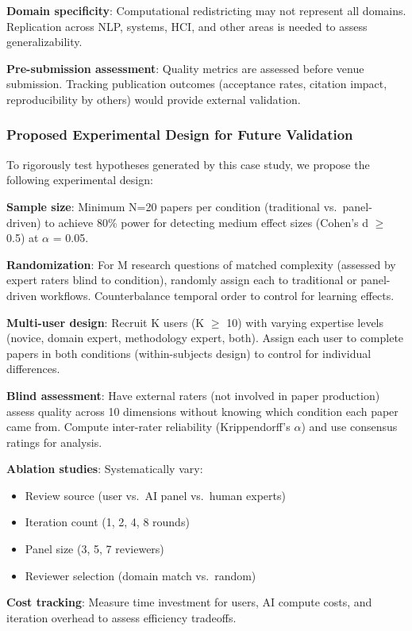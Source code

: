 \textbf{Domain specificity}: Computational redistricting may not represent all domains. Replication across NLP, systems, HCI, and other areas is needed to assess generalizability.

\textbf{Pre-submission assessment}: Quality metrics are assessed before venue submission. Tracking publication outcomes (acceptance rates, citation impact, reproducibility by others) would provide external validation.

\subsubsection{Proposed Experimental Design for Future Validation}

To rigorously test hypotheses generated by this case study, we propose the following experimental design:

\textbf{Sample size}: Minimum N=20 papers per condition (traditional vs.\ panel-driven) to achieve 80\% power for detecting medium effect sizes (Cohen's d $\geq$ 0.5) at $\alpha$ = 0.05.

\textbf{Randomization}: For M research questions of matched complexity (assessed by expert raters blind to condition), randomly assign each to traditional or panel-driven workflows. Counterbalance temporal order to control for learning effects.

\textbf{Multi-user design}: Recruit K users (K $\geq$ 10) with varying expertise levels (novice, domain expert, methodology expert, both). Assign each user to complete papers in both conditions (within-subjects design) to control for individual differences.

\textbf{Blind assessment}: Have external raters (not involved in paper production) assess quality across 10 dimensions without knowing which condition each paper came from. Compute inter-rater reliability (Krippendorff's $\alpha$) and use consensus ratings for analysis.

\textbf{Ablation studies}: Systematically vary:
\begin{itemize}[leftmargin=*]
\item Review source (user vs.\ AI panel vs.\ human experts)
\item Iteration count (1, 2, 4, 8 rounds)
\item Panel size (3, 5, 7 reviewers)
\item Reviewer selection (domain match vs.\ random)
\end{itemize}

\textbf{Cost tracking}: Measure time investment for users, AI compute costs, and iteration overhead to assess efficiency tradeoffs.

